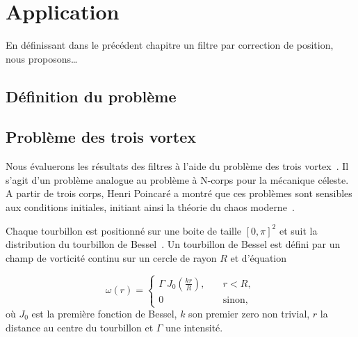 
\section{Application}

En définissant dans le précédent chapitre un filtre par correction de position, nous proposons\dots

\subsection{Définition du problème}
\subsection{Problème des trois vortex}

Nous évaluerons les résultats des filtres à l'aide du problème des trois vortex~\cite{aref_motion_1979,yim_motion_2022}. Il s'agit d'un problème analogue au problème à N-corps pour la mécanique céleste. A partir de trois corps, Henri Poincaré a montré que ces problèmes sont sensibles aux conditions initiales, initiant ainsi la théorie du chaos moderne~\cite{poincare1890,diacu1996}.

Chaque tourbillon est positionné sur une boite de taille $[0, \pi]^2$  et suit la distribution du tourbillon de Bessel~\cite{vanGeffen1996}. Un tourbillon de Bessel est défini par un champ de vorticité continu sur un cercle de rayon $R$ et d'équation

\begin{equation*}
    \omega(r) =  \begin{cases}
        \Gamma ~ J_0\left(\frac{k  r}{ R}\right),   \quad & r < R,        \\
        0 \quad                                           & \text{sinon},
    \end{cases}
\end{equation*}où $J_0$ est la première fonction de Bessel, $k$ son premier zero non trivial, $r$ la distance au centre du tourbillon et $\Gamma$ une intensité.

